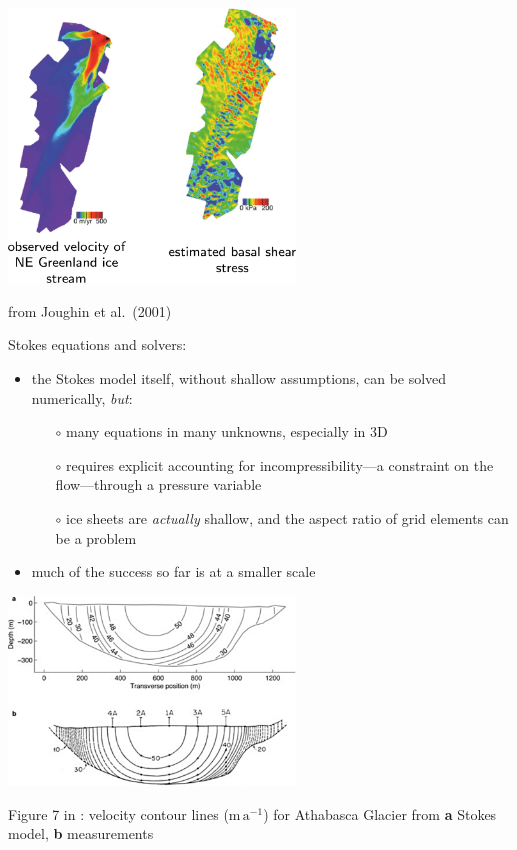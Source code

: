 \documentclass[titlepage,letterpaper,final,12pt]{scrartcl}
\newcommand{\alert}[1]{\emph{#1}}
\begin{document}
\begin{center}
  \includegraphics[width=3.0in]{NEgreenlandJoughin}
  
from Joughin et al.~(2001)\nocite{Joughinetal2001}
\end{center}

Stokes equations and solvers:

\begin{itemize}
\item the Stokes model itself, without shallow assumptions, can be solved numerically, \alert{but}:
  \begin{itemize}
  \item[$\circ$] many equations in many unknowns, especially in 3D
  \item[$\circ$] requires explicit accounting for incompressibility---a constraint on the flow---through a pressure variable
  \item[$\circ$] ice sheets are \emph{actually} shallow, and the aspect ratio of grid elements can be a problem
  \end{itemize}
\item much of the success so far is at a smaller scale
\end{itemize}

\begin{center}
\includegraphics[width=3.0in]{athabasca}

Figure 7 in \cite{Maxwelletal2008}:  velocity contour lines ($\text{m}\,\text{a}^{-1}$) for Athabasca Glacier from \textbf{a} Stokes model, \textbf{b} measurements \cite{Raymond1971}
\end{center}
\end{document}

